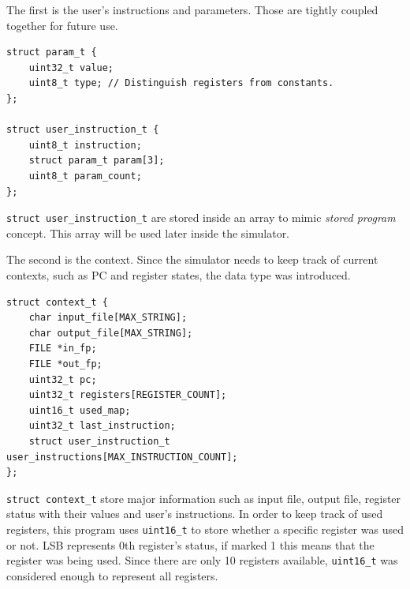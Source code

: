 \documentclass{homework}
\begin{document}
The first is the user's instructions and parameters. Those are tightly coupled together for future use.
\\
\begin{center}
\begin{code}
\begin{verbatim}
struct param_t {
    uint32_t value;
    uint8_t type; // Distinguish registers from constants. 
};

struct user_instruction_t {
    uint8_t instruction;
    struct param_t param[3];
    uint8_t param_count;
};
\end{verbatim}
\end{code}
\end{center}

\texttt{struct user_instruction_t} are stored inside an array to mimic \textit{stored program} concept. This array will be used later inside the simulator.

The second is the context. Since the simulator needs to keep track of current contexts, such as PC and register states, the data type was introduced.
\\
\begin{center}
\begin{code}
\begin{verbatim}
struct context_t {
    char input_file[MAX_STRING];
    char output_file[MAX_STRING];
    FILE *in_fp;
    FILE *out_fp;
    uint32_t pc;
    uint32_t registers[REGISTER_COUNT];
    uint16_t used_map;
    uint32_t last_instruction;
    struct user_instruction_t user_instructions[MAX_INSTRUCTION_COUNT];
};
\end{verbatim}
\end{code}
\end{center}

\texttt{struct context_t} store major information such as input file, output file, register status with their values and user's instructions. In order to keep track of used registers, this program uses \texttt{uint16_t} to store whether a specific register was used or not. LSB represents 0th register's status, if marked 1 this means that the register was being used. Since there are only 10 registers available, \texttt{uint16_t} was considered enough to represent all registers. 
\end{document}
